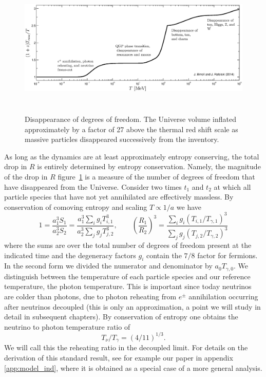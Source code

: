 \begin{figure} 
\centerline{\hspace*{0.4cm}\includegraphics[height=6.6cm]{03-birrell/ErasOfUniverse/z_T_plot.eps}}
\caption{Disappearance of degrees of freedom. The Universe volume inflated approximately by a factor of 27 above the thermal red shift scale as massive particles disappeared successively from the inventory.\label{fig:dof}}
 \end{figure}



As long as the dynamics are at least approximately entropy conserving, the total drop in $R$ is entirely determined by entropy conservation. Namely, the magnitude of the drop in $R$ figure~\ref{fig:dof} is a measure of the number of degrees of freedom that have disappeared from the Universe. Consider   two times $t_1$ and $t_2$ at which all particle species that have not yet annihilated are effectively massless.  By conservation of comoving entropy and  scaling $T\propto 1/a$ we have
\begin{equation}\label{r_ratio}
1=\frac{a_1^3S_{1}}{a_2^3 S_2}=\frac{a_1^3\sum_ig_i T_{i,1}^3}{a_2^3\sum_j g_j T_{j,2}^3},\qquad \left(\frac{R_1}{R_2}\right)^3=\frac{\sum_ig_i (T_{i,1}/T_{\gamma,1})^3}{\sum_j g_j (T_{j,2}/T_{\gamma,2})^3}
\end{equation}
where the sums are over the total number of degrees of freedom present at the indicated time and the degeneracy factors $g_i$ contain the $7/8$ factor for fermions. In the second form    we divided the numerator and denominator by $a_{0}T_{\gamma,0}$. We distinguish between the temperature of each particle species and our reference temperature, the photon temperature.  This is important since today neutrinos are colder than photons, due to photon reheating from  $e^\pm$ annihilation occurring after neutrinos decoupled (this is only an approximation, a point we will study in detail in subsequent chapters).  By conservation of entropy one obtains the neutrino to photon temperature ratio of
\begin{equation}\label{T_nu_T_gamma}
T_\nu/T_\gamma=({4}/{11})^{1/3}.
\end{equation}
We will call this the reheating ratio in the decoupled limit.  For details on the derivation of this standard result, see for example our paper in appendix \ref{app:model_ind}, where it is obtained as a special case of a more general analysis. 

